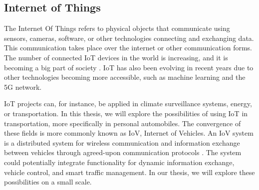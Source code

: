 \subsection{Internet of Things}

The Internet Of Things refers to physical objects that communicate using sensors, cameras, software, or other technologies connecting and exchanging data. This communication takes place over the internet or other communication forms. The number of connected IoT devices in the world is increasing, and it is becoming a big part of society \parencite{iot_analytics}. IoT has also been evolving in recent years due to other technologies becoming more accessible, such as machine learning and the 5G network.

IoT projects can, for instance, be applied in climate surveillance systems, energy, or transportation. In this thesis, we will explore the possibilities of using IoT in transportation, more specifically in personal automobiles. The convergence of these fields is more commonly known as IoV, Internet of Vehicles. An IoV system is a distributed system for wireless communication and information exchange between vehicles through agreed-upon communication protocols \parencite{chinese_iov}. The system could potentially integrate functionality for dynamic information exchange, vehicle control, and smart traffic management. In our thesis, we will explore these possibilities on a small scale.
